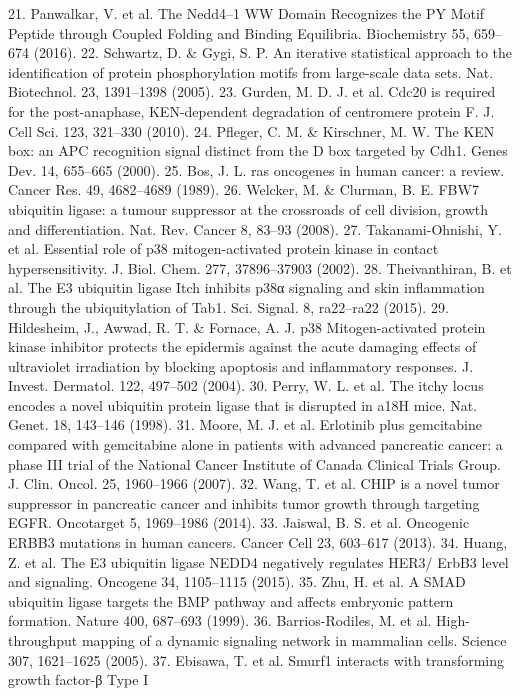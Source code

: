 21. Panwalkar, V. et al. The Nedd4–1 WW Domain Recognizes the PY Motif
Peptide through Coupled Folding and Binding Equilibria. Biochemistry 55,
659–674 (2016).
22. Schwartz, D. \& Gygi, S. P. An iterative statistical approach to the identiﬁcation
of protein phosphorylation motifs from large-scale data sets. Nat. Biotechnol.
23, 1391–1398 (2005).
23. Gurden, M. D. J. et al. Cdc20 is required for the post-anaphase, KEN-dependent
degradation of centromere protein F. J. Cell Sci. 123, 321–330 (2010).
24. Pﬂeger, C. M. \& Kirschner, M. W. The KEN box: an APC recognition signal
distinct from the D box targeted by Cdh1. Genes Dev. 14, 655–665 (2000).
25. Bos, J. L. ras oncogenes in human cancer: a review. Cancer Res. 49, 4682–4689
(1989).
26. Welcker, M. \& Clurman, B. E. FBW7 ubiquitin ligase: a tumour suppressor at
the crossroads of cell division, growth and differentiation. Nat. Rev. Cancer 8,
83–93 (2008).
27. Takanami-Ohnishi, Y. et al. Essential role of p38 mitogen-activated protein
kinase in contact hypersensitivity. J. Biol. Chem. 277, 37896–37903 (2002).
28. Theivanthiran, B. et al. The E3 ubiquitin ligase Itch inhibits p38α signaling and
skin inﬂammation through the ubiquitylation of Tab1. Sci. Signal. 8, ra22–ra22
(2015).
29. Hildesheim, J., Awwad, R. T. \& Fornace, A. J. p38 Mitogen-activated protein
kinase inhibitor protects the epidermis against the acute damaging effects
of ultraviolet irradiation by blocking apoptosis and inﬂammatory responses.
J. Invest. Dermatol. 122, 497–502 (2004).
30. Perry, W. L. et al. The itchy locus encodes a novel ubiquitin protein ligase that
is disrupted in a18H mice. Nat. Genet. 18, 143–146 (1998).
31. Moore, M. J. et al. Erlotinib plus gemcitabine compared with gemcitabine alone
in patients with advanced pancreatic cancer: a phase III trial of the National
Cancer Institute of Canada Clinical Trials Group. J. Clin. Oncol. 25, 1960–1966
(2007).
32. Wang, T. et al. CHIP is a novel tumor suppressor in pancreatic cancer and
inhibits tumor growth through targeting EGFR. Oncotarget 5, 1969–1986 (2014).
33. Jaiswal, B. S. et al. Oncogenic ERBB3 mutations in human cancers. Cancer Cell
23, 603–617 (2013).
34. Huang, Z. et al. The E3 ubiquitin ligase NEDD4 negatively regulates HER3/
ErbB3 level and signaling. Oncogene 34, 1105–1115 (2015).
35. Zhu, H. et al. A SMAD ubiquitin ligase targets the BMP pathway and affects
embryonic pattern formation. Nature 400, 687–693 (1999).
36. Barrios-Rodiles, M. et al. High-throughput mapping of a dynamic signaling
network in mammalian cells. Science 307, 1621–1625 (2005).
37. Ebisawa, T. et al. Smurf1 interacts with transforming growth factor-β Type I
